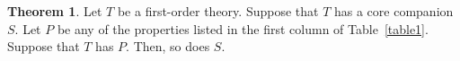 \documentclass{amsart}
\theoremstyle{definition}
\newtheorem{theorem}{Theorem}[section]
\theoremstyle{remark}
\numberwithin{equation}{section}
\newcommand{\pau}[1]{\textcolor{blue}{#1}}
\begin{document}
\begin{theorem}\label{thm:mc-pres} Let $T$ be a first-order theory. Suppose that $T$ has a core companion  $S$. Let $P$ be any of the properties listed in the first column of Table~\ref{table1}. Suppose that $T$ has $P$. Then, so does $S$. 

 
 


\end{theorem}
\end{document}
